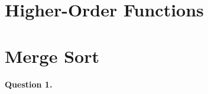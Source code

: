 \section*{Higher\hyp{}Order Functions}
\label{ans:higher-order_functions}




\section*{Merge Sort}
\label{ans:merge_sort}


\medskip

\paragraph{Question 1.}

